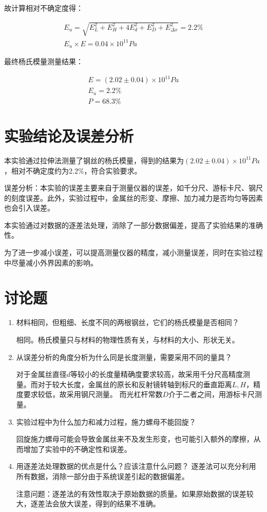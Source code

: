 \documentclass[signature=data]{physicsreport}
\begin{document}
故计算相对不确定度得：

\begin{gather*}
E_u = \sqrt{ E_L^2 + E_H^2 + 4E_d^2 + E_D^2 + E_{\Delta x}^2 } = 2.2\%\\
E_u \times E = 0.04 \times 10^{11}Pa
\end{gather*}

最终杨氏模量测量结果：

\begin{gather*}
E = (2.02 \pm 0.04) \times 10^{11}Pa\\
E_u = 2.2\%\\
P = 68.3\%
\end{gather*}

\section{实验结论及误差分析}
本实验通过拉伸法测量了钢丝的杨氏模量，得到的结果为$(2.02 \pm 0.04) \times 10^{11}Pa$，相对不确定度约为2.2\%，符合实验要求。

误差分析：本实验的误差主要来自于测量仪器的误差，如千分尺、游标卡尺、钢尺的刻度误差。此外，实验过程中，金属丝的形变、摩擦、加力减力是否均匀等因素也会引入误差。

本实验通过对数据的逐差法处理，消除了一部分数据偏差，提高了实验结果的准确性。

为了进一步减小误差，可以提高测量仪器的精度，减小测量误差，同时在实验过程中尽量减小外界因素的影响。

\section{讨论题}
\begin{enumerate}
    \item 材料相同，但粗细、长度不同的两根钢丝，它们的杨氏模量是否相同？
 
    相同。杨氏模量只与材料的物理性质有关，与材料的大小、形状无关。

    \item 从误差分析的角度分析为什么同是长度测量，需要采用不同的量具？
    
    对于金属丝直径$d$等较小的长度量精确度要求较高，故采用千分尺高精度测量。而对于较大长度，金属丝的原长和反射镜转轴到标尺的垂直距离$L,H$，精度要求较低，故采用钢尺测量。
    而光杠杆常数$D$介于二者之间，用游标卡尺测量。

    \item 实验过程中为什么加力和减力过程，施力螺母不能回旋？
    
    回旋施力螺母可能会导致金属丝来不及发生形变，也可能引入额外的摩擦，从而增加了实验中的不确定性和误差。

    \item 用逐差法处理数据的优点是什么？应该注意什么问题？
    逐差法可以充分利用所有数据，消除一部分由于系统误差引起的数据偏差。

    注意问题：逐差法的有效性取决于原始数据的质量。如果原始数据的误差较大，逐差法会放大误差，得到的结果不准确。
\end{enumerate}
\end{document}
